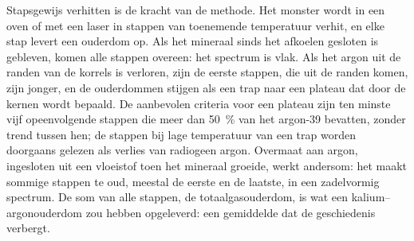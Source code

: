 Stapsgewijs verhitten is de kracht van de methode. Het monster wordt in een oven
of met een laser in stappen van toenemende temperatuur verhit, en elke stap levert een
ouderdom op. Als het mineraal sinds het afkoelen gesloten is gebleven, komen alle stappen overeen: het spectrum is
vlak. Als het argon uit de randen van de korrels is verloren, zijn de eerste stappen, die
uit de randen komen, zijn jonger, en de ouderdommen stijgen als een trap naar een
plateau dat door de kernen wordt bepaald. De aanbevolen criteria voor een plateau zijn
ten minste vijf opeenvolgende stappen die meer dan \qty{50}{\percent} van het
argon-39 bevatten, zonder trend tussen hen; de stappen bij lage temperatuur van een trap
worden doorgaans gelezen als verlies van radiogeen argon. Overmaat aan argon, ingesloten uit een
vloeistof toen het mineraal groeide, werkt andersom: het maakt sommige stappen te oud,
meestal de eerste en de laatste, in een zadelvormig spectrum. De som van alle
stappen, de totaalgasouderdom, is wat een kalium--argonouderdom zou hebben opgeleverd: een
gemiddelde dat de geschiedenis verbergt.

